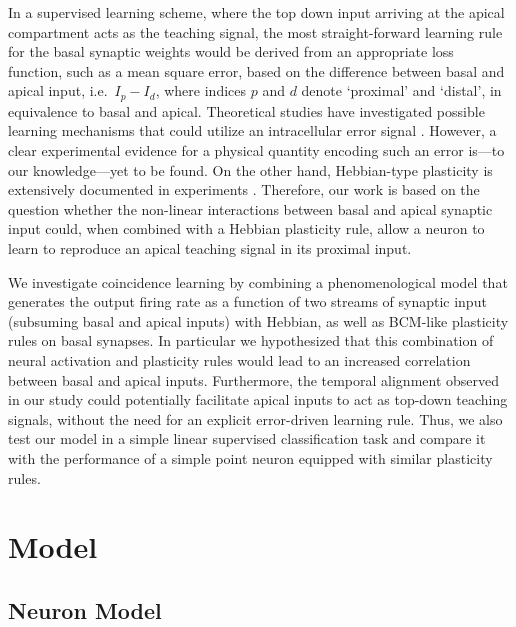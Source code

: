 \documentclass[utf8]{frontiersSCNS} %
\begin{document}
In a supervised learning scheme, where the top down input
arriving at the apical compartment acts as the teaching signal,
the most straight-forward learning rule for the basal synaptic
weights would be derived from an appropriate loss function,
such as a mean square error, based on the difference between 
basal and apical input, i.e.\ $I_p - I_d$,
where indices $p$ and $d$ denote `proximal' and
`distal', in equivalence to basal and apical. 
Theoretical studies have investigated possible 
learning mechanisms that could utilize an 
intracellular error signal
\citep{Urbanczik2014,Schiess2016,Guerguiev2017}.
However, a clear experimental
evidence for a physical quantity encoding such an error 
is---to our knowledge---yet to be found. 
On the other hand, Hebbian-type plasticity is extensively
documented in experiments 
\citep{Gustafsson1987,Debanne1994,Markram1997,Bi1998}. 
Therefore, our work is based on the question whether the 
non-linear interactions between basal and apical synaptic input could, 
when combined with a Hebbian plasticity rule, allow a neuron
to learn to reproduce an apical teaching signal in its
proximal input.

We investigate coincidence learning by
combining a phenomenological model that 
generates the output firing rate as a function 
of two streams of synaptic input (subsuming basal 
and apical inputs) with Hebbian, as well as 
BCM-like plasticity rules on basal synapses. 
In particular we hypothesized that this combination of neural 
activation and plasticity rules would lead to an
increased correlation between basal and apical inputs.
Furthermore, the temporal alignment observed in our study 
could potentially facilitate apical inputs to act as 
top-down teaching signals, without the need for an 
explicit error-driven learning rule. Thus, we also 
test our model in a simple linear supervised 
classification task and compare it with the 
performance of a simple point neuron equipped with 
similar plasticity rules.

\section{Model}
\label{sect:model}

\subsection{Neuron Model}
\label{sect:neuronmodel}
\end{document}
